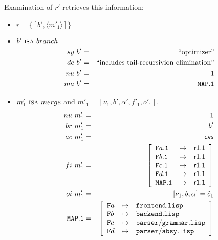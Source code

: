 \documentclass[fleqn, 10pt, a4paper]{article}
\begin{document}
Examination of $r'$ retrieves this information:

\begin{itemize}
\item $r=\{[b', \langle m'_1\rangle]\}$
\item $b'\ \mbox{\textsc{isa}}\ \mathnormal{branch}$
\begin{eqnarray*}
\mathnormal{sy}\ b' &=& \mbox{``optimizer''} \\
\mathnormal{de}\ b' &=& \mbox{``includes tail-recursivion elimination''} \\
\mathnormal{nu}\ b' &=& 1 \\
\mathnormal{ma}\ b' &=& \mathtt{MAP.1}
\end{eqnarray*}

\item $m'_1\ \mbox{\textsc{isa}}\ \mathnormal{merge}$ and
$m'_1=[\nu_1, b', \alpha', f'_1, o'_1]$.
\begin{eqnarray*}
\mathnormal{nu}\ m'_1 &=& 1 \\
\mathnormal{br}\ m'_1 &=& b' \\
\mathnormal{ac}\ m'_1 &=& \mathsf{cvs} \\
\mathnormal{fi}\ m'_1 &=& \left[
\begin{array}{lcl}
\mathtt{F}a\mathtt{.1} & \mapsto & \mathsf{r1.1} \\
\mathtt{F}b\mathtt{.1} & \mapsto & \mathsf{r1.1} \\
\mathtt{F}c\mathtt{.1} & \mapsto & \mathsf{r1.1} \\
\mathtt{F}d\mathtt{.1} & \mapsto & \mathsf{r1.1} \\
\mathtt{MAP.1}         & \mapsto & \mathsf{r1.1} \\
\end{array}\right] \\
\mathnormal{oi}\ m'_1 &=& [\nu_1, b, \alpha] = \hat c_1 \\
\mathtt{MAP.1} &=& \left[
\begin{array}{lcl}
\mathtt{F}a &\mapsto& \mathtt{frontend.lisp} \\
\mathtt{F}b &\mapsto& \mathtt{backend.lisp} \\
\mathtt{F}c &\mapsto& \mathtt{parser/grammar.lisp} \\
\mathtt{F}d &\mapsto& \mathtt{parser/absy.lisp} \\
\end{array}\right]
\end{eqnarray*}
\end{itemize}
\end{document}
